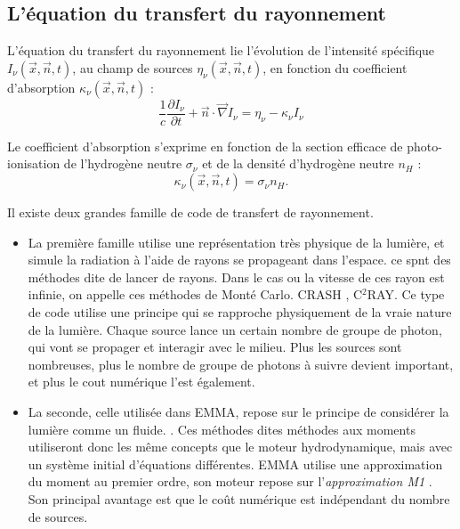 \subsection{L'équation du transfert du rayonnement}

L'équation du transfert du rayonnement lie l'évolution de l'intensité spécifique $I_\nu(\vec{x},\vec{n},t)$, au champ de sources $\eta_\nu(\vec{x},\vec{n},t)$, en fonction du coefficient d'absorption $\kappa_\nu(\vec{x},\vec{n},t)$ :
\begin{equation}
\frac{1}{c} \frac{\partial I_\nu}{\partial t} + \vec{n}\cdot \vec{\nabla} I_\nu = \eta_\nu - \kappa_\nu I_\nu 
\label{eq:rad}
\end{equation}

Le coefficient d'absorption s'exprime en fonction de la section efficace de photo-ionisation de l'hydrogène neutre $\sigma_\nu$ et de la densité d'hydrogène neutre $n_H$ :
\begin{equation}
\kappa_\nu(\vec{x},\vec{n},t) = \sigma_\nu n_H.
\end{equation}

Il existe deux grandes famille de code de transfert de rayonnement.
\begin{itemize}
\item La première famille utilise une représentation très physique de la lumière, et simule la radiation à l'aide de rayons se propageant dans l'espace.
ce spnt des méthodes dite de lancer de rayons.
Dans le cas ou la vitesse de ces rayon est infinie, on appelle ces méthodes de Monté Carlo.
CRASH \citep{2003MNRAS.345..379M}, C$^2$RAY\citep{2006NewA...11..374M}.
Ce type de code utilise une principe qui se rapproche physiquement de la vraie nature de la lumière.
Chaque source lance un certain nombre de groupe de photon, qui vont se propager et interagir avec le milieu.
Plus les sources sont nombreuses, plus le nombre de groupe de photons à suivre devient important, et plus le cout numérique l'est également.

\item La seconde, celle utilisée dans EMMA, repose sur le principe de considérer la lumière comme un fluide. \citep{gnedin_multi-dimensional_2001, aubert_radiative_2008}.
Ces méthodes dites méthodes aux moments utiliseront donc les même concepts que le moteur hydrodynamique, mais avec un système initial d'équations différentes. 
EMMA utilise une approximation du moment au premier ordre, son moteur repose sur l'\textit{approximation M1} \citep{levermore_relating_1984}.
Son principal avantage est que le coût numérique est indépendant du nombre de sources.
\end{itemize}


